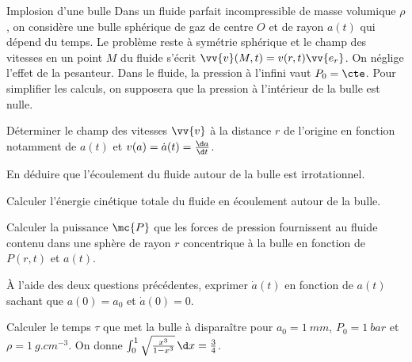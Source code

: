 \begin{exo}[PC][1]{Implosion d'une bulle}
Dans un fluide parfait incompressible de masse volumique $\rho$, on considère une bulle sphérique de gaz de centre $O$ et de rayon $a(t)$ qui dépend du temps. Le problème reste à symétrie sphérique et le champ des vitesses en un point $M$ du fluide s'écrit $\vv{v}(M,t)=v(r,t)\vv{e_r}$. On néglige l'effet de la pesanteur. Dans le fluide, la pression à l'infini vaut $P_{0}=\cte$. Pour simplifier les calculs, on supposera que la pression à l'intérieur de la bulle est nulle.
\begin{quest}
\item Déterminer le champ des vitesses $\vv{v}$ à la distance $r$ de l'origine en fonction notamment de $a(t)$ et $v(a)=\dot{a}(t)=\frac{\d a}{\d t}$.
\item En déduire que l'écoulement du fluide autour de la bulle est irrotationnel.
\item Calculer l'énergie cinétique totale du fluide en écoulement autour de la bulle.
\item Calculer la puissance $\mc{P}$ que les forces de pression fournissent au fluide contenu dans une sphère de rayon $r$ concentrique à la bulle en fonction de $P(r,t)$ et $a(t)$.
\item À l'aide des deux questions précédentes, exprimer $\dot{a}(t)$ en fonction de $a(t)$ sachant que $a(0)=a_{0}$ et $\dot{a}(0)=0$.
\item Calculer le temps $\tau$ que met la bulle à disparaître pour $a_{0}=\SI{1}{mm}$, $P_{0}=\SI{1}{bar}$ et $\rho=\SI{1}{g.cm^{-3}}$. On donne $\int_{0}^{1}\sqrt{\frac{x^3}{1-x^3}}\,\d x=\frac{3}{4}$.
\end{quest}
\end{exo}

